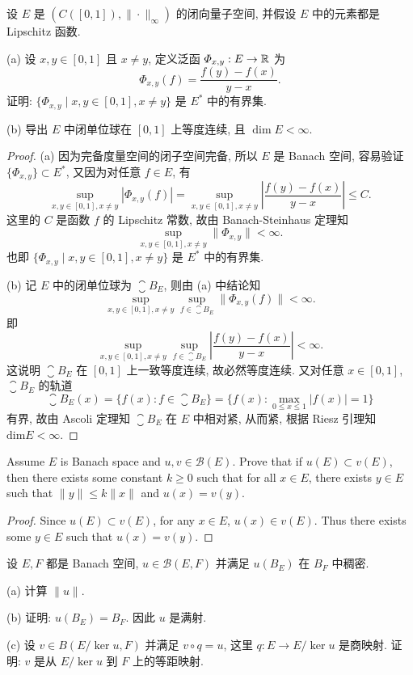 \begin{exercise}[8]
    设 $E$ 是 $(C([0,1]),\|\cdot\|_{\infty})$ 的闭向量子空间, 并假设 $E$ 中的元素都是 Lipschitz 函数.

    (a) 设 $x,y\in [0,1]$ 且 $x\neq y$, 定义泛函 $\varPhi_{x,y}:E\to\mathbb{R}$ 为
    \[\varPhi_{x,y}(f)=\frac{f(y)-f(x)}{y-x}.\]
    证明: $\{\varPhi_{x,y}\mid x,y\in [0,1],x\neq y\}$ 是 $E^*$ 中的有界集.

    (b) 导出 $E$ 中闭单位球在 $[0,1]$ 上等度连续, 且 $\dim E<\infty$.
\end{exercise}

\begin{proof}
    (a) 因为完备度量空间的闭子空间完备, 所以 $E$ 是 Banach 空间,
    容易验证 $\{\varPhi_{x,y}\}\subset E^*$, 又因为对任意 $f\in E$, 有
    \[\sup_{x,y\in[0,1],x\neq y}|\varPhi_{x,y}(f)|=\sup_{x,y\in[0,1],x\neq y}\left|\frac{f(y)-f(x)}{y-x}\right|\leq C.\]
    这里的 $C$ 是函数 $f$ 的 Lipschitz 常数, 故由 Banach-Steinhaus 定理知
    \[\sup_{x,y\in[0,1],x\neq y}\|\varPhi_{x,y}\|<\infty.\]
    也即 $\{\varPhi_{x,y}\mid x,y\in[0,1],x\neq y\}$ 是 $E^*$ 中的有界集.

    (b) 记 $E$ 中的闭单位球为 $\closure{B_E}$, 则由 (a) 中结论知
    \[\sup_{x,y\in[0,1],x\neq y}\sup_{f\in \closure{B_E}}\|\varPhi_{x,y}(f)\|<\infty.\]
    即
    \[\sup_{x,y\in[0,1],x\neq y}\sup_{f\in \closure{B_E}}\left|\frac{f(y)-f(x)}{y-x}\right|<\infty.\]
    这说明 $\closure{B_E}$ 在 $[0,1]$ 上一致等度连续, 故必然等度连续.
    又对任意 $x\in[0,1]$, $\closure{B_E}$ 的轨道
    \[\closure{B_E}(x)=\{f(x):f\in \closure{B_E}\}=\{f(x):\max_{0\leq x\leq 1}|f(x)|=1\}\]
    有界, 故由 Ascoli 定理知 $\closure{B_E}$ 在 $E$ 中相对紧, 从而紧, 根据 Riesz 引理知 $\textrm{dim}E<\infty$.
\end{proof}


\begin{exercise}
  Assume $E$ is Banach space and $u,v\in\mathcal{B}(E)$. Prove that
  if $u(E)\subset v(E)$, then there exists some constant $k\geq 0$
  such that for all $x\in E$, there exists $y\in E$ such that
  $\|y\|\leq k\|x\|$ and $u(x) = v(y)$.
\end{exercise}

\begin{proof}
  Since $u(E)\subset v(E)$, for any $x\in E$, $u(x)\in v(E)$. Thus
  there exists some $y\in E$ such that $u(x) = v(y)$.
\end{proof}


\begin{exercise}[10]
    设 $E,F$ 都是 Banach 空间, $u\in\mathcal{B}(E,F)$ 并满足 $u(B_E)$ 在 $B_F$ 中稠密.

    (a) 计算 $\|u\|$.

    (b) 证明: $u(B_E)=B_F$. 因此 $u$ 是满射.

    (c) 设 $v\in B(E/\ker u,F)$ 并满足 $v\circ q=u$, 这里 $q:E\to E/\ker u$
    是商映射. 证明: $v$ 是从 $E/\ker u$ 到 $F$ 上的等距映射.
\end{exercise}


